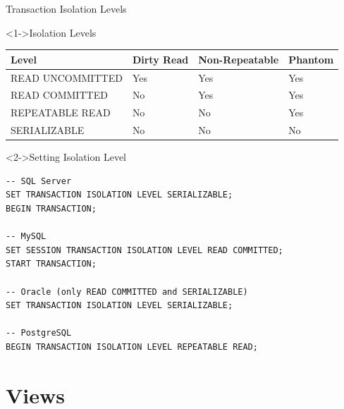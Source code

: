 \documentclass[aspectratio=169,11pt]{beamer}
\begin{document}
\begin{frame}{Transaction Isolation Levels}
\begin{block}<1->{Isolation Levels}
\begin{center}
\begin{tabular}{llll}
\toprule
\textbf{Level} & \textbf{Dirty Read} & \textbf{Non-Repeatable} & \textbf{Phantom} \\
\midrule
READ UNCOMMITTED & Yes & Yes & Yes \\
READ COMMITTED & No & Yes & Yes \\
REPEATABLE READ & No & No & Yes \\
SERIALIZABLE & No & No & No \\
\bottomrule
\end{tabular}
\end{center}
\end{block}

\pause
\begin{exampleblock}<2->{Setting Isolation Level}
\begin{lstlisting}
-- SQL Server
SET TRANSACTION ISOLATION LEVEL SERIALIZABLE;
BEGIN TRANSACTION;

-- MySQL
SET SESSION TRANSACTION ISOLATION LEVEL READ COMMITTED;
START TRANSACTION;

-- Oracle (only READ COMMITTED and SERIALIZABLE)
SET TRANSACTION ISOLATION LEVEL SERIALIZABLE;

-- PostgreSQL
BEGIN TRANSACTION ISOLATION LEVEL REPEATABLE READ;
\end{lstlisting}
\end{exampleblock}
\end{frame}

\section{Views}
\end{document}

